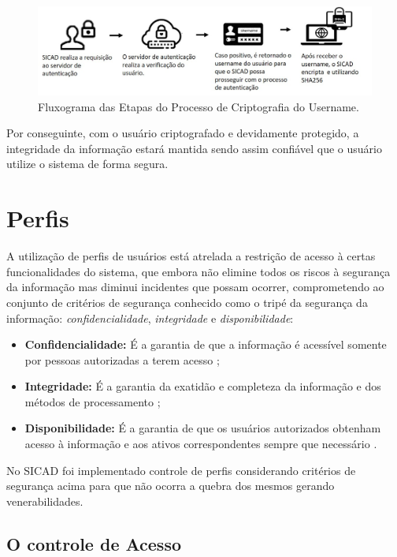 \documentclass[12pt, a4paper]{report}
\begin{document}
\begin{figure}
\centering
\includegraphics[scale=0.80]{fluxograma_criptografia.jpg}
\caption{Fluxograma das Etapas do Processo de Criptografia do Username.}
\label{fig:fluxograma_criptografia}
\end{figure}

Por conseguinte, com o usuário criptografado e devidamente protegido, a integridade da informação estará mantida sendo assim confiável que o usuário utilize o sistema de forma segura.

\section{ Perfis}
A utilização de perfis de usuários está atrelada a restrição de acesso à certas funcionalidades do sistema, que embora não elimine todos os riscos à segurança da informação mas diminui incidentes que possam ocorrer, comprometendo ao conjunto de critérios de segurança conhecido como o tripé da segurança da informação: \textit{confidencialidade}, \textit{integridade} e \textit{disponibilidade}:

\begin{itemize}
\item \textbf{Confidencialidade:} É a garantia de que a informação é acessível somente por pessoas autorizadas a terem acesso \cite{iso27002};
\item \textbf{Integridade:} É a garantia da exatidão e completeza da informação e dos métodos de processamento \cite{iso27002};
\item \textbf{Disponibilidade:} É a garantia de que os usuários autorizados obtenham acesso à informação e aos ativos correspondentes sempre  que necessário \cite{iso27002}.
\end{itemize}

No \ac{SICAD} foi implementado controle de perfis considerando critérios de segurança acima para que não ocorra a quebra dos mesmos gerando venerabilidades.

\subsection{O controle de Acesso}
\end{document}
